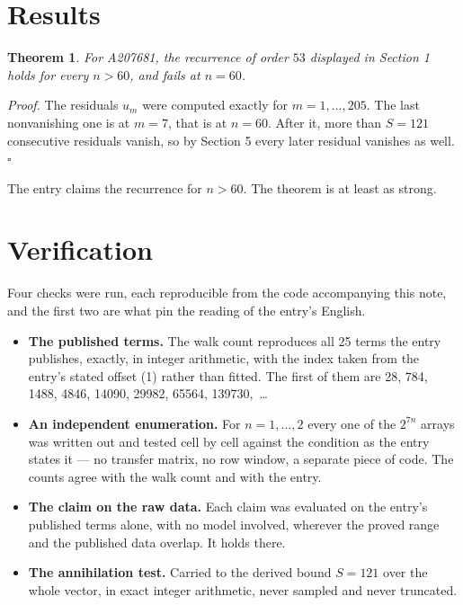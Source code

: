 \documentclass[11pt]{article}
\newtheorem{theorem}{Theorem}
\theoremstyle{definition}
\begin{document}
\section{Results}

\begin{theorem} For A207681, the recurrence of order $53$ displayed in Section 1 holds for every $n > 60$, and fails at $n = 60$.\end{theorem}

{\itshape Proof.} The residuals $u_m$ were computed exactly for $m = 1,\dots,205$. The last nonvanishing one is at $m = 7$, that is at $n = 60$. After it, more than $S = 121$ consecutive residuals vanish, so by Section 5 every later residual vanishes as well. $\square$

The entry claims the recurrence for $n > 60$. The theorem is at least as strong.

\section{Verification}

Four checks were run, each reproducible from the code accompanying this note, and the first two are what pin the reading of the entry's English.

\begin{itemize}

\item {\bfseries The published terms.} The walk count reproduces all 25 terms the entry publishes, exactly, in integer arithmetic, with the index taken from the entry's stated offset (1) rather than fitted. The first of them are 28, 784, 1488, 4846, 14090, 29982, 65564, 139730,~\dots

\item {\bfseries An independent enumeration.} For $n = 1,\dots,2$ every one of the $2^{7n}$ arrays was written out and tested cell by cell against the condition as the entry states it --- no transfer matrix, no row window, a separate piece of code. The counts agree with the walk count and with the entry.

\item {\bfseries The claim on the raw data.} Each claim was evaluated on the entry's published terms alone, with no model involved, wherever the proved range and the published data overlap. It holds there.

\item {\bfseries The annihilation test.} Carried to the derived bound $S = 121$ over the whole vector, in exact integer arithmetic, never sampled and never truncated.

\end{itemize}
\end{document}
